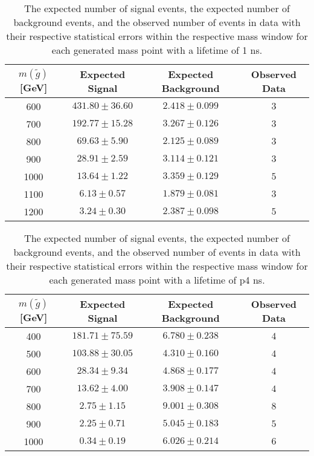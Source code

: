 \begin{table}[!htbp]
  \begin{center}
    \begin{tabular}{cccc}
      \hline
      $m(\tilde{g})$ [GeV]  & Expected Signal & Expected Background & Observed Data\\ 
      \hline
      600    & $431.80 \pm 36.60 $ & $2.418 \pm 0.099 $ & $3$ \\
      700    & $192.77 \pm 15.28 $ & $3.267 \pm 0.126 $ & $3$ \\
      800    & $69.63 \pm 5.90 $ & $2.125 \pm 0.089 $ &   $3$ \\
      900    & $28.91 \pm 2.59 $ & $3.114 \pm 0.121 $ &   $3$ \\
      1000    & $13.64 \pm 1.22 $ & $3.359 \pm 0.129 $ &  $5$ \\
      1100    & $6.13 \pm 0.57 $ & $1.879 \pm 0.081 $ &   $3$ \\
      1200    & $3.24 \pm 0.30 $ & $2.387 \pm 0.098 $ &   $5$ \\
      \hline
    \end{tabular}
  \end{center}
  \caption{The expected number of signal events, the expected number of background events, and the observed number of events in data with their respective statistical errors within the respective mass window for each generated mass point with a lifetime of 1 ns.}
  \label{tab:app_counts_1ns}
\end{table}

\begin{table}[!htbp]
  \begin{center}
    \begin{tabular}{cccc}
      \hline
      $m(\tilde{g})$ [GeV]  & Expected Signal & Expected Background & Observed Data\\ 
      \hline
      400    & $181.71 \pm 75.59 $ & $6.780 \pm 0.238 $ & $4$ \\
      500    & $103.88 \pm 30.05 $ & $4.310 \pm 0.160 $ & $4$ \\
      600    & $28.34 \pm 9.34 $ & $4.868 \pm 0.177 $ &   $4$ \\
      700    & $13.62 \pm 4.00 $ & $3.908 \pm 0.147 $ &   $4$ \\
      800    & $2.75 \pm 1.15 $ & $9.001 \pm 0.308 $ &    $8$ \\
      900    & $2.25 \pm 0.71 $ & $5.045 \pm 0.183 $ &    $5$ \\
      1000    & $0.34 \pm 0.19 $ & $6.026 \pm 0.214 $ &   $6$ \\
      \hline
    \end{tabular}
  \end{center}
  \caption{The expected number of signal events, the expected number of background events, and the observed number of events in data with their respective statistical errors within the respective mass window for each generated mass point with a lifetime of p4 ns.}
  \label{tab:app_counts_p4ns}
\end{table}

